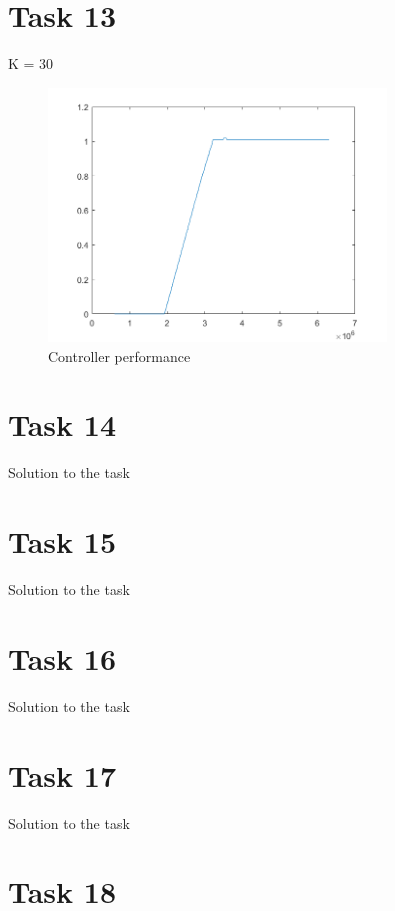 \documentclass[a4paper,12pt,oneside,onecolumn]{article} %
\begin{document}
\section*{Task 13}
K = 30
\begin{figure}[H]
\begin{center}	
  \includegraphics[width = 0.8\textwidth]{task13.png}
  \caption{Controller performance}
 \end{center}
\end{figure}

\section*{Task 14}

Solution to the task

\section*{Task 15}

Solution to the task

\section*{Task 16}

Solution to the task

\section*{Task 17}

Solution to the task

\section*{Task 18}
\end{document}
